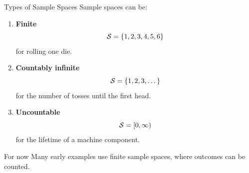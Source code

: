 \begin{frame}{Types of Sample Spaces}
Sample spaces can be:

\begin{enumerate}
    \item \textbf{Finite}
    \[
    \mathcal{S} = \{1,2,3,4,5,6\}
    \]
    for rolling one die.

    \item \textbf{Countably infinite}
    \[
    \mathcal{S} = \{1,2,3,\dots\}
    \]
    for the number of tosses until the first head.

    \item \textbf{Uncountable}
    \[
    \mathcal{S} = [0,\infty)
    \]
    for the lifetime of a machine component.
\end{enumerate}

\vspace{0.15cm}

\begin{keybox}{For now}
Many early examples use finite sample spaces, where outcomes can be counted.
\end{keybox}
\end{frame}



